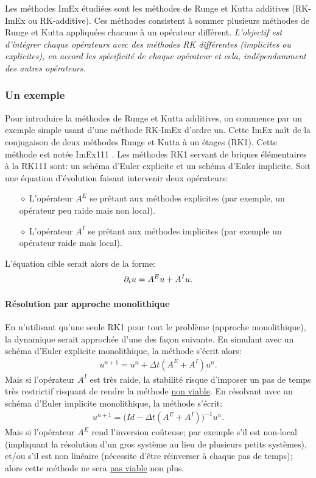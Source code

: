 \label{par:ImEx_presentation}
Les méthodes ImEx étudiées sont les méthodes de Runge et Kutta additives (RK-ImEx ou RK-additive).
Ces méthodes consistent à sommer plusieurs méthodes de Runge et Kutta appliquées chacune à un opérateur différent.
\textit{L'objectif est d'intégrer chaque opérateurs avec des méthodes RK différentes (implicites ou explicites), en accord
les spécificité de chaque opérateur et cela, indépendamment des autres opérateurs.}
\subsubsection{Un exemple}
    Pour introduire la méthodes de Runge et Kutta additives, on commence par un exemple simple usant d'une méthode RK-ImEx
    d'ordre un. Cette ImEx naît de la conjugaison de deux méthodes Runge et Kutta à un étages (RK1). 
    Cette méthode est notée ImEx111 \cite{ASCHER1997151}.
    Les méthodes RK1 servant de briques élémentaires à la RK111 sont: un schéma d'Euler explicite et un schéma d'Euler implicite.
    Soit une équation d'évolution faisant intervenir deux opérateurs:
    \begin{itemize}
        \item[$\diamond$] L'opérateur $A^E$ se prêtant aux méthodes explicites (par exemple, un opérateur peu raide mais non local).
        \item[$\diamond$] L'opérateur $A^I$ se prêtant aux méthodes implicites (par exemple un opérateur raide mais local).
    \end{itemize}
    L'équation cible serait alors de la forme: 
    \begin{align}
        \partial_t u = A^E u + A^I u.
    \end{align}
    \paragraph{Résolution par approche monolithique}
        En n'utilisant qu'une seule RK1 pour tout le problème (approche monolithique), la dynamique serait approchée d'une des façon suivante.
            En simulant avec un schéma d'Euler explicite monolithique, la méthode s'écrit alors:
            \begin{align}
                u^{n+1} = u^n + \Delta t (A^E + A^I) u^n.
            \end{align}
            Mais si l'opérateur $A^I$ est très raide, la stabilité risque d'imposer un pas de temps très restrictif risquant de rendre la méthode \underline{non viable}.
            En résolvant avec un schéma d'Euler implicite monolithique, la méthode s'écrit:
            \begin{align}
                u^{n+1} = \bigl(Id - \Delta t (A^E + A^I)\bigr)^{-1} u^n.
            \end{align}
            Mais si l'opérateur $A^E$ rend l'inversion coûteuse;
            par exemple s'il est non-local (impliquant la résolution d'un gros système au lieu de plusieurs petits systèmes), 
            et/ou s'il est non linéaire (nécessite d'être réinverser à chaque pas de temps);
            alors cette méthode ne sera \underline{pas viable} non plus.
